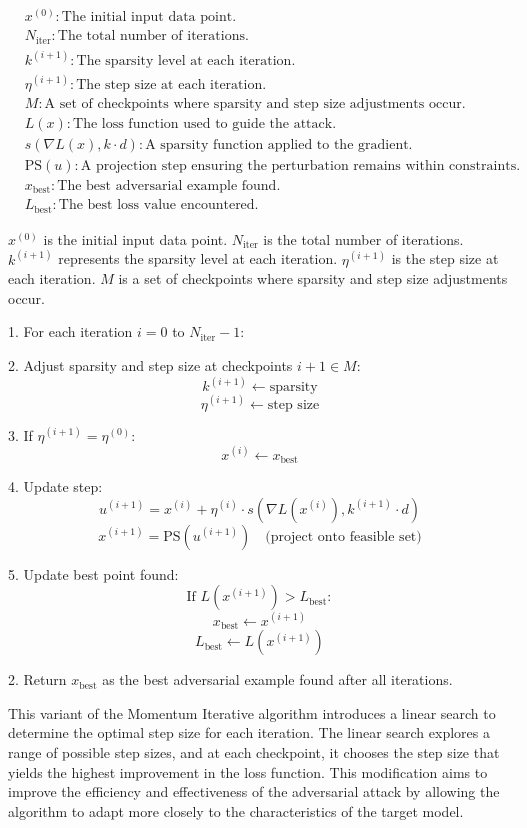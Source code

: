 \begin{align*}
    & x^{(0)}: \text{The initial input data point.} \\
    & N_{\text{iter}}: \text{The total number of iterations.} \\
    & k^{(i+1)}: \text{The sparsity level at each iteration.} \\
    & \eta^{(i+1)}: \text{The step size at each iteration.} \\
    & M: \text{A set of checkpoints where sparsity and step size adjustments occur.} \\
    & L(x): \text{The loss function used to guide the attack.} \\
    & s(\nabla L(x), k \cdot d): \text{A sparsity function applied to the gradient.} \\
    & \text{PS}(u): \text{A projection step ensuring the perturbation remains within constraints.} \\
    & x_{\text{best}}: \text{The best adversarial example found.} \\
    & L_{\text{best}}: \text{The best loss value encountered.}
\end{align*}

\( x^{(0)} \) is the initial input data point.  
\( N_{\text{iter}} \) is the total number of iterations.  
\( k^{(i+1)} \) represents the sparsity level at each iteration.  
\( \eta^{(i+1)} \) is the step size at each iteration.  
\( M \) is a set of checkpoints where sparsity and step size adjustments occur.

1. For each iteration \( i = 0 \) to \( N_{\text{iter}} - 1 \):

    2. Adjust sparsity and step size at checkpoints \( i + 1 \in M \):
       \[
       k^{(i+1)} \leftarrow \text{sparsity}
       \]
       \[
       \eta^{(i+1)} \leftarrow \text{step size}
       \]
       
    3. If \( \eta^{(i+1)} = \eta^{(0)} \):
       \[
       x^{(i)} \leftarrow x_{\text{best}}
       \]
       
    4. Update step:
       \[
       u^{(i+1)} = x^{(i)} + \eta^{(i)} \cdot s(\nabla L(x^{(i)}), k^{(i+1)} \cdot d)
       \]
       \[
       x^{(i+1)} = \text{PS}(u^{(i+1)}) \quad \text{(project onto feasible set)}
       \]
       
    5. Update best point found:
       \[
       \text{If } L(x^{(i+1)}) > L_{\text{best}}:
       \]
       \[
       x_{\text{best}} \leftarrow x^{(i+1)}
       \]
       \[
       L_{\text{best}} \leftarrow L(x^{(i+1)})
       \]

2. Return \( x_{\text{best}} \) as the best adversarial example found after all iterations.

This variant of the Momentum Iterative algorithm introduces a linear search to determine the optimal step size for each iteration. The linear search explores a range of possible step sizes, and at each checkpoint, it chooses the step size that yields the highest improvement in the loss function. This modification aims to improve the efficiency and effectiveness of the adversarial attack by allowing the algorithm to adapt more closely to the characteristics of the target model.